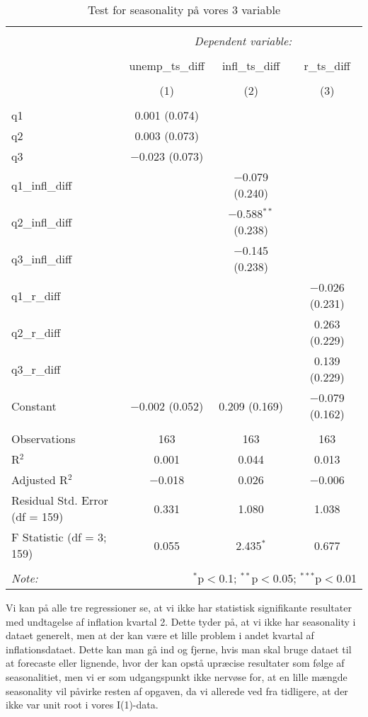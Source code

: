 \documentclass[
  10pt,
]{article}
\begin{document}
\begin{table}[H] \centering 
  \caption{Test for seasonality på vores 3 variable} 
  \label{} 
\begin{tabular}{@{\extracolsep{5pt}}lccc} 
\\[-1.8ex]\hline 
\hline \\[-1.8ex] 
 & \multicolumn{3}{c}{\textit{Dependent variable:}} \\ 
\cline{2-4} 
\\[-1.8ex] & unemp\_ts\_diff & infl\_ts\_diff & r\_ts\_diff \\ 
\\[-1.8ex] & (1) & (2) & (3)\\ 
\hline \\[-1.8ex] 
 q1 & 0.001 (0.074) &  &  \\ 
  q2 & 0.003 (0.073) &  &  \\ 
  q3 & $-$0.023 (0.073) &  &  \\ 
  q1\_infl\_diff &  & $-$0.079 (0.240) &  \\ 
  q2\_infl\_diff &  & $-$0.588$^{**}$ (0.238) &  \\ 
  q3\_infl\_diff &  & $-$0.145 (0.238) &  \\ 
  q1\_r\_diff &  &  & $-$0.026 (0.231) \\ 
  q2\_r\_diff &  &  & 0.263 (0.229) \\ 
  q3\_r\_diff &  &  & 0.139 (0.229) \\ 
  Constant & $-$0.002 (0.052) & 0.209 (0.169) & $-$0.079 (0.162) \\ 
 \hline \\[-1.8ex] 
Observations & 163 & 163 & 163 \\ 
R$^{2}$ & 0.001 & 0.044 & 0.013 \\ 
Adjusted R$^{2}$ & $-$0.018 & 0.026 & $-$0.006 \\ 
Residual Std. Error (df = 159) & 0.331 & 1.080 & 1.038 \\ 
F Statistic (df = 3; 159) & 0.055 & 2.435$^{*}$ & 0.677 \\ 
\hline 
\hline \\[-1.8ex] 
\textit{Note:}  & \multicolumn{3}{r}{$^{*}$p$<$0.1; $^{**}$p$<$0.05; $^{***}$p$<$0.01} \\ 
\end{tabular} 
\end{table}

Vi kan på alle tre regressioner se, at vi ikke har statistisk
signifikante resultater med undtagelse af inflation kvartal 2. Dette
tyder på, at vi ikke har seasonality i dataet generelt, men at der kan
være et lille problem i andet kvartal af inflationsdataet. Dette kan man
gå ind og fjerne, hvis man skal bruge dataet til at forecaste eller
lignende, hvor der kan opstå upræcise resultater som følge af
seasonalitiet, men vi er som udgangspunkt ikke nervøse for, at en lille
mængde seasonality vil påvirke resten af opgaven, da vi allerede ved fra
tidligere, at der ikke var unit root i vores I(1)-data. \newpage
\end{document}
